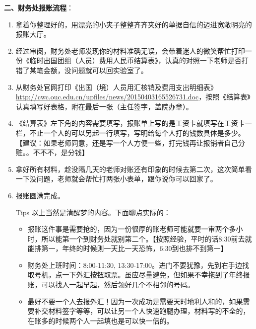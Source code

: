 \documentclass{article}
\begin{document}
\textbf{二、财务处报账流程}：
\begin{enumerate}
\item 拿着你整理好的，用漂亮的小夹子整整齐齐夹好的单据自信的迈进宽敞明亮的报账大厅。
\item 经过审阅，财务处老师发现你的材料准确无误，会带着迷人的微笑帮忙打印一份《临时出国团组（人员）费用人民币结算表》，认真的对照一下老师是否打错了某笔金额，没问题就可以回实验室了。
\item 从财务处官网打印《出国（境）人员用汇核销及费用支出明细表》\url{http://cwc.ouc.edu.cn/upfiles/news/20150403165526731.doc}，按照《结算表》认真填写好表格，附在最后一张（主任签字，盖院办章）。
\item 《结算表》左下角的内容需要填写，报账单上写的是工资卡就填写在工资卡一栏，不止一个人的可以另起一行填写，写明给每个人打的钱数具体是多少。【建议：如果老师同意，还是写一个人方便一些，打完钱再让报销者自己分赃。。不不不，是分钱】
\item 拿好所有材料，趁没隔几天的老师对账还有印象的时候去第二次，这次简单看一下没问题，老师就会帮忙打两张小表单，跟你说你可以回家了。
\item 报账圆满完成。
\item[Tips] 以上当然是清醒梦的内容。下面聊点实际的：
\begin{itemize}
\item 报账这件事是需要抢的，因为一份很厚的账老师可能就要一审两个多小时，所以能第一个到财务处就别第二个。【按照经验，平时的话8:30前去就能排第一，年终的时候则一天比一天恐怖，6:30到也排不到第一】
\item 财务处上班时间：8:00-11:30, 13:30-17:00。进门不要犹豫，先到右手边找取号机，点一下外汇按钮取票。虽应尽量避免，但如果不幸拖到了年终报账，可以找人一起早起，然后领好几个不相邻的号码。
\item 最好不要一个人去报外汇！因为一次成功是需要天时地利人和的，如果需要补交材料签字等等，可以让另一个人快速跑腿办理，材料写的不全的，在账多的时候两个人一起填也是可以快一倍的。
\end{itemize}
\end{enumerate}
\end{document}
